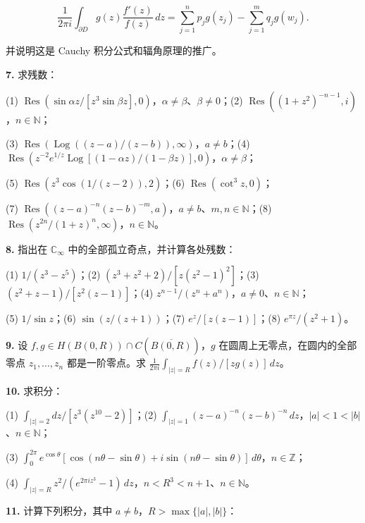 \documentclass[11pt,a4paper]{article}
\begin{document}
\[
\frac1{2\pi i}\int_{\partial D}g(z)\frac{f'(z)}{f(z)}\,dz
=\sum_{j=1}^np_jg(z_j)-\sum_{j=1}^mq_jg(w_j).
\]

并说明这是 Cauchy 积分公式和辐角原理的推广。

\par{}
\noindent\textbf{7.} 求残数：

(1)
\(\operatorname{Res}(\sin\alpha z/[z^3\sin\beta z],0)\)，\(\alpha\ne\beta\)、\(\beta\ne0\)；(2)
\(\operatorname{Res}((1+z^2)^{-n-1},i)\)，\(n\in\mathbb N\)；

(3)
\(\operatorname{Res}(\operatorname{Log}((z-a)/(z-b)),\infty)\)，\(a\ne b\)；(4)
\(\operatorname{Res}(z^{-2}e^{1/z}\operatorname{Log}[(1-\alpha z)/(1-\beta z)],0)\)，\(\alpha\ne\beta\)；

(5) \(\operatorname{Res}(z^3\cos(1/(z-2)),2)\)；(6)
\(\operatorname{Res}(\cot^3z,0)\)；

(7)
\(\operatorname{Res}((z-a)^{-n}(z-b)^{-m},a)\)，\(a\ne b\)、\(m,n\in\mathbb N\)；(8)
\(\operatorname{Res}(z^{2n}/(1+z)^n,\infty)\)，\(n\in\mathbb N\)。

\par{}
\noindent\textbf{8.} 指出在 \(\mathbb C_\infty\)
中的全部孤立奇点，并计算各处残数：

(1) \(1/(z^3-z^5)\)；(2) \((z^3+z^2+2)/[z(z^2-1)^2]\)；(3)
\((z^2+z-1)/[z^2(z-1)]\)；(4)
\(z^{n-1}/(z^n+a^n)\)，\(a\ne0\)、\(n\in\mathbb N\)；

(5) \(1/\sin z\)；(6) \(\sin(z/(z+1))\)；(7) \(e^z/[z(z-1)]\)；(8)
\(e^{\pi z}/(z^2+1)\)。

\par{}
\noindent\textbf{9.} 设 \(f,g\in H(B(0,R))\cap C(\overline{B(0,R)})\)，\(g\)
在圆周上无零点，在圆内的全部零点 \(z_1,\ldots,z_n\) 都是一阶零点。求
\(\frac1{2\pi i}\int_{|z|=R}f(z)/[zg(z)]\,dz\)。

\par{}
\noindent\textbf{10.} 求积分：

(1) \(\int_{|z|=2}dz/[z^3(z^{10}-2)]\)；(2)
\(\int_{|z|=1}(z-a)^{-n}(z-b)^{-n}\,dz\)，\(|a|<1<|b|\)、\(n\in\mathbb N\)；

(3)
\(\int_0^{2\pi}e^{\cos\theta}[\cos(n\theta-\sin\theta)+i\sin(n\theta-\sin\theta)]\,d\theta\)，\(n\in\mathbb Z\)；

(4)
\(\int_{|z|=R}z^2/(e^{2\pi iz^3}-1)\,dz\)，\(n<R^3<n+1\)、\(n\in\mathbb N\)。

\par{}
\noindent\textbf{11.} 计算下列积分，其中 \(a\ne b\)，\(R>\max\{|a|,|b|\}\)：
\end{document}
